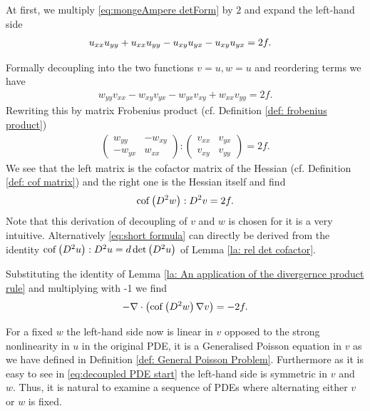 At first, we multiply \eqref{eq:mongeAmpere detForm} by $2$ and expand the left-hand side
\begin{align}
 	u_{x x } u_{y y }+u_{x x } u_{y y } -u_{x y } u_{y x } -u_{x y } u_{y x } &=2 f. 
\end{align}

Formally decoupling into the two functions $v = u ,w = u$ and reordering terms we have
\begin{align}
	w_{yy} v_{xx}- w_{xy} v_{yx} - w_{yx} v_{xy} +w_{xx} v_{yy} = 2f. \label{eq:decoupled PDE start}
\end{align}
Rewriting this by matrix Frobenius product (cf. Definition \ref{def: frobenius product})
\begin{align}
 \begin{pmatrix} w_{yy} & -w_{xy}  \\ -w_{yx} & w_{xx} \end{pmatrix}: \begin{pmatrix} v_{xx} & v_{yx}  \\  v_{xy} & v_{yy} \end{pmatrix} = 2f.
\end{align}
We see that the left matrix is the cofactor matrix of the Hessian (cf. Definition \ref{def: cof matrix}) and the right one is the Hessian itself and find
\begin{align}
		\operatorname{cof} \left( D^2 w  \right):D^2 v  = 2f. \label{eq:short formula}
\end{align}
Note that this derivation of decoupling of $v$ and $w$ is chosen for it is a very intuitive. Alternatively \eqref{eq:short formula} can directly be derived from the identity $\operatorname{cof} \left( D^2 u  \right):D^2 u  = d \det{\left(D^2 u\right)}$ of Lemma \ref{la: rel det cofactor}.

Substituting the identity of Lemma \ref{la: An application of the divergernce product rule} and multiplying with -1 we find
\begin{align}
	- \nabla \cdot \left( \operatorname{cof} \left(  D^2 w \right) \nabla v \right)  = -2f.  \label{eq:decoupled PDE}
\end{align}

For a fixed $w$ the left-hand side now is linear in $v$ opposed to the strong nonlinearity in $u$ in the original PDE, it is a Generalised Poisson equation in $v$ as we have defined in Definition \ref{def: General Poisson Problem}. 
Furthermore as it is easy to see in \eqref{eq:decoupled PDE start} the left-hand side is symmetric in $v$ and $w$. Thus, it is natural to examine a sequence of PDEs where alternating either $v$ or $w$ is fixed. 

